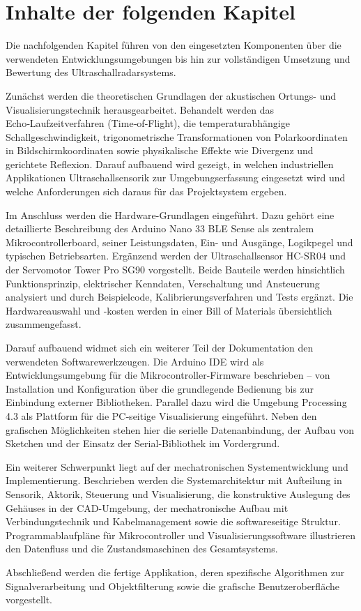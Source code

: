 \chapter{Inhalte der folgenden Kapitel}

Die nachfolgenden Kapitel führen von den eingesetzten Komponenten über die verwendeten Entwicklungsumgebungen bis hin zur vollständigen Umsetzung und Bewertung des Ultraschallradarsystems. 

Zunächst werden die theoretischen Grundlagen der akustischen Ortungs- und Visualisierungstechnik herausgearbeitet. Behandelt werden das Echo‑Laufzeitverfahren (Time‑of‑Flight), die temperaturabhängige Schallgeschwindigkeit, trigonometrische Transformationen von Polarkoordinaten in Bildschirmkoordinaten sowie physikalische Effekte wie Divergenz und gerichtete Reflexion. Darauf aufbauend wird gezeigt, in welchen industriellen Applikationen Ultraschallsensorik zur Umgebungserfassung eingesetzt wird und welche Anforderungen sich daraus für das Projektsystem ergeben. 

Im Anschluss werden die Hardware-Grundlagen eingeführt. Dazu gehört eine detaillierte Beschreibung des Arduino Nano 33 BLE Sense als zentralem Mikrocontrollerboard, seiner Leistungsdaten, Ein- und Ausgänge, Logikpegel und typischen Betriebsarten. Ergänzend werden der Ultraschallsensor HC-SR04 und der Servomotor Tower Pro SG90 vorgestellt. Beide Bauteile werden hinsichtlich Funktionsprinzip, elektrischer Kenndaten, Verschaltung und Ansteuerung analysiert und durch Beispielcode, Kalibrierungsverfahren und Tests ergänzt. Die Hardwareauswahl und ‑kosten werden in einer Bill of Materials übersichtlich zusammengefasst. 

Darauf aufbauend widmet sich ein weiterer Teil der Dokumentation den verwendeten Softwarewerkzeugen. Die Arduino IDE wird als Entwicklungsumgebung für die Mikrocontroller-Firmware beschrieben – von Installation und Konfiguration über die grundlegende Bedienung bis zur Einbindung externer Bibliotheken. Parallel dazu wird die Umgebung Processing 4.3 als Plattform für die PC‑seitige Visualisierung eingeführt. Neben den grafischen Möglichkeiten stehen hier die serielle Datenanbindung, der Aufbau von Sketchen und der Einsatz der Serial‑Bibliothek im Vordergrund. 

Ein weiterer Schwerpunkt liegt auf der mechatronischen Systementwicklung und Implementierung. Beschrieben werden die Systemarchitektur mit Aufteilung in Sensorik, Aktorik, Steuerung und Visualisierung, die konstruktive Auslegung des Gehäuses in der CAD-Umgebung, der mechatronische Aufbau mit Verbindungstechnik und Kabelmanagement sowie die softwareseitige Struktur. Programmablaufpläne für Mikrocontroller und Visualisierungssoftware illustrieren den Datenfluss und die Zustandsmaschinen des Gesamtsystems. 

Abschlie\ss end werden die fertige Applikation, deren spezifische Algorithmen zur Signalverarbeitung und Objektfilterung sowie die grafische Benutzeroberfläche vorgestellt.
